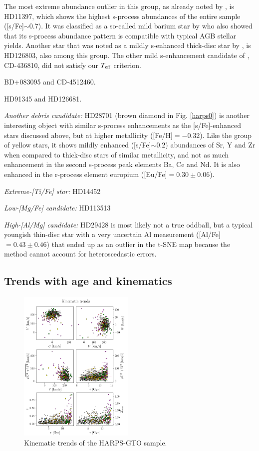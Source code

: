 \documentclass{aa}  %
\begin{document}
The most extreme abundance outlier in this group, as already noted by \citet{DelgadoMena2017}, is HD11397, which shows the highest s-process abundances of the entire sample ([s/Fe]$\sim0.7$). It was classified as a so-called mild barium star by \citet{Pompeia2008} who also showed that its s-process abundance pattern is compatible with typical AGB stellar yields. 
Another star that was noted as a mildly s-enhanced thick-disc star by \citet{DelgadoMena2017}, is HD126803, also among this group. The other mild s-enhancement candidate of \citet{DelgadoMena2017}, CD-436810, did not satisfy our $T_{\rm eff}$ criterion.

BD+083095 and CD-4512460.

HD91345 and HD126681.

{\it Another debris candidate:} HD28701 (brown diamond in Fig. \ref{harps0}) is another interesting object with similar s-process enhancements as the [s/Fe]-enhanced stars discussed above, but at higher metallicity ([Fe/H]$=-0.32$). Like the group of yellow stars, it shows mildly enhanced ([s/Fe]$\sim0.2$) abundances of Sr, Y and Zr when compared to thick-disc stars of similar metallicity, and not as much enhancement in the second s-process peak elements Ba, Ce and Nd. It is also enhanced in the r-process element europium ([Eu/Fe]$=0.30\pm0.06$). 

{\it Extreme-[Ti/Fe] star:} HD14452

{\it Low-[Mg/Fe] candidate:} HD113513

{\it High-[Al/Mg] candidate:} HD29428 is most likely not a true oddball, but a typical youngish thin-disc star with a very uncertain Al measurement ([Al/Fe]$=0.43\pm0.46$) that ended up as an outlier in the t-SNE map because the method cannot account for heteroscedastic errors.

\subsection{Trends with age and kinematics}

\begin{figure}\centering
 \includegraphics[width=0.49\textwidth]{im/harps_tsne-kin-abundsplot_teffcut.png}
\caption{Kinematic trends of the HARPS-GTO sample.}
\label{kin}
\end{figure}
\end{document}
